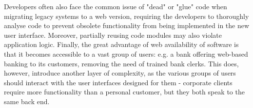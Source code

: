 Developers often also face the common issue of "dead" or "glue" code when migrating legacy systems to a web version, requiring the developers to thoroughly analyse code to prevent obsolete functionality from being implemented in the new user interface. Moreover, partially reusing code modules may also violate application logic\cite{stroulia2003user}. Finally, the great advantage of web availability of software is that it becomes accessible to a vast group of users: e.g. a bank offering web-based banking to its customers, removing the need of trained bank clerks. This does, however, introduce another layer of complexity, as the various groups of users should interact with the user interfaces designed for them - corporate clients require more functionality than a personal customer, but they both speak to the same back end\cite{aversano2001migrating}.